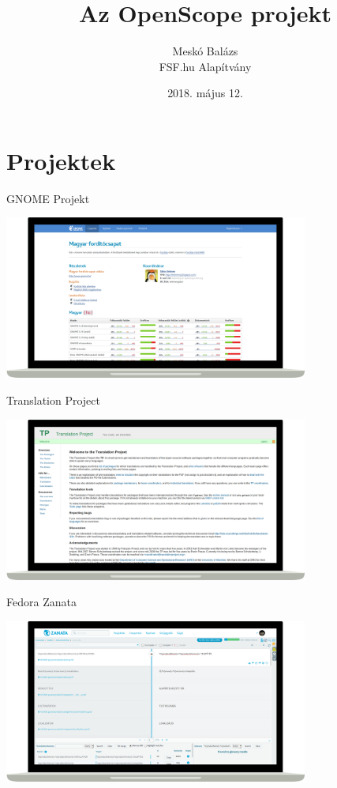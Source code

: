 \documentclass{beamer}
\title{Az OpenScope projekt}
\date{2018. május 12.}
\author{Meskó Balázs \texorpdfstring{\\}{} FSF.hu Alapítvány}
\institute{Szabad Szoftver Konferencia és Kiállítás 2018}
\begin{document}
{
  \maketitle
}

  \section{Projektek}
  
  \begin{frame}{GNOME Projekt}
    \begin{center}
    \includegraphics[width=10cm]{images/gnome-laptop.png}
    \end{center}
  \end{frame}

  \begin{frame}{Translation Project}
    \begin{center}
      \includegraphics[width=10cm]{images/tp-laptop.png}
    \end{center}
  \end{frame}

  \begin{frame}{Fedora Zanata}
    \begin{center}
      \includegraphics[width=10cm]{images/fedora-zanata-laptop.png}
    \end{center}
  \end{frame}
\end{document}
